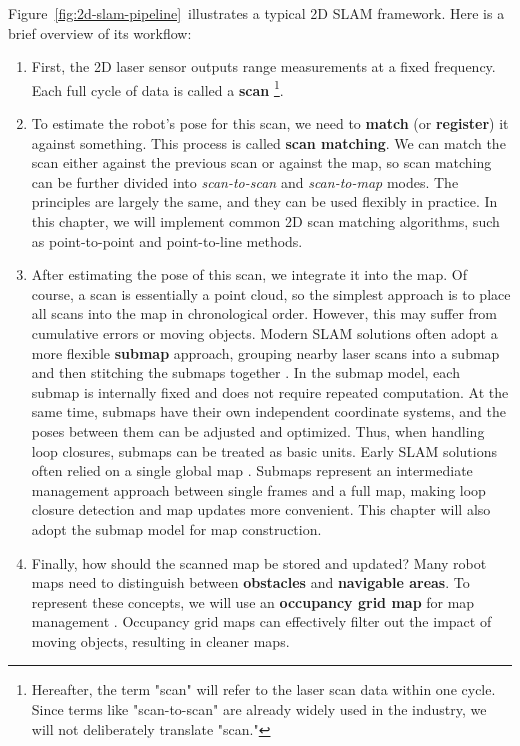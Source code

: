 Figure~\ref{fig:2d-slam-pipeline}~illustrates a typical 2D SLAM framework. Here is a brief overview of its workflow:  

\begin{enumerate}  
	\item First, the 2D laser sensor outputs range measurements at a fixed frequency. Each full cycle of data is called a \textbf{scan} \footnote{Hereafter, the term "scan" will refer to the laser scan data within one cycle. Since terms like "scan-to-scan" are already widely used in the industry, we will not deliberately translate "scan."}.  
	\item To estimate the robot's pose for this scan, we need to \textbf{match} (or \textbf{register}) it against something. This process is called \textbf{scan matching}. We can match the scan either against the previous scan or against the map, so scan matching can be further divided into \textit{scan-to-scan} and \textit{scan-to-map} modes. The principles are largely the same, and they can be used flexibly in practice. In this chapter, we will implement common 2D scan matching algorithms, such as point-to-point and point-to-line methods.  
	\item After estimating the pose of this scan, we integrate it into the map. Of course, a scan is essentially a point cloud, so the simplest approach is to place all scans into the map in chronological order. However, this may suffer from cumulative errors or moving objects. Modern SLAM solutions often adopt a more flexible \textbf{submap} approach, grouping nearby laser scans into a submap and then stitching the submaps together \cite{Hess2016}. In the submap model, each submap is internally fixed and does not require repeated computation. At the same time, submaps have their own independent coordinate systems, and the poses between them can be adjusted and optimized. Thus, when handling loop closures, submaps can be treated as basic units. Early SLAM solutions often relied on a single global map \cite{Grisetti2007a}. Submaps represent an intermediate management approach between single frames and a full map, making loop closure detection and map updates more convenient. This chapter will also adopt the submap model for map construction.  
	\item Finally, how should the scanned map be stored and updated? Many robot maps need to distinguish between \textbf{obstacles} and \textbf{navigable areas}. To represent these concepts, we will use an \textbf{occupancy grid map} for map management \cite{Thrun2003a, MeyerDelius2012}. Occupancy grid maps can effectively filter out the impact of moving objects, resulting in cleaner maps.  
\end{enumerate}  

